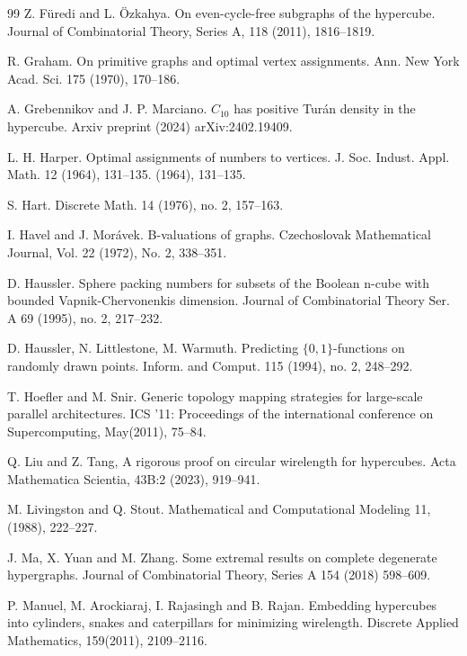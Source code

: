 \documentclass[11pt, a4paper]{article}
\begin{document}
\begin{thebibliography}{99}
Z. F\"uredi and L. \"{O}zkahya.
\newblock On even-cycle-free subgraphs of the hypercube.
Journal of Combinatorial Theory, Series A, 118 (2011), 1816--1819.


R. Graham.
On primitive graphs and optimal vertex assignments.
Ann. New York Acad. Sci. 175 (1970), 170--186.


 A. Grebennikov and J. P. Marciano. $C_{10}$ has positive Tur\'an density in the hypercube. Arxiv preprint (2024) arXiv:2402.19409.


  L. H. Harper. Optimal assignments of numbers to vertices.  J. Soc. Indust. Appl. Math. 12 (1964), 131–135. (1964), 131--135.


  S. Hart. 
Discrete Math. 14 (1976), no. 2, 157--163.


 I. Havel and J. Mor\'avek.
\newblock B-valuations of graphs.
Czechoslovak Mathematical Journal, Vol. 22 (1972), No. 2, 338--351.

 D. Haussler.
Sphere packing numbers for subsets of the Boolean n-cube with bounded Vapnik-Chervonenkis dimension. 
Journal of  Combinatorial  Theory Ser. A 69 (1995), no. 2, 217--232.

  D. Haussler, N.  Littlestone, M. Warmuth. Predicting $\{0,1\}$-functions on randomly drawn points. Inform. and Comput. 115 (1994), no. 2, 248--292.


  T. Hoefler and M. Snir.  Generic topology mapping strategies for large-scale parallel architectures. ICS ’11: Proceedings of the international conference on Supercomputing, May(2011), 75--84. 



  Q. Liu and Z. Tang, A rigorous proof on circular wirelength for hypercubes.  Acta Mathematica Scientia, 43B:2 (2023), 919--941.

M. Livingston and Q. Stout.
Mathematical and Computational Modeling 11, (1988), 222--227.



 J. Ma, X. Yuan and M. Zhang. 
\newblock Some extremal results on complete degenerate hypergraphs.
 Journal of Combinatorial Theory, Series A 154 (2018) 598--609.



  P. Manuel, M. Arockiaraj, I. Rajasingh and  B. Rajan. Embedding hypercubes into cylinders, snakes and caterpillars for minimizing wirelength. Discrete Applied Mathematics, 159(2011), 2109--2116.


\end{thebibliography}
\end{document}
